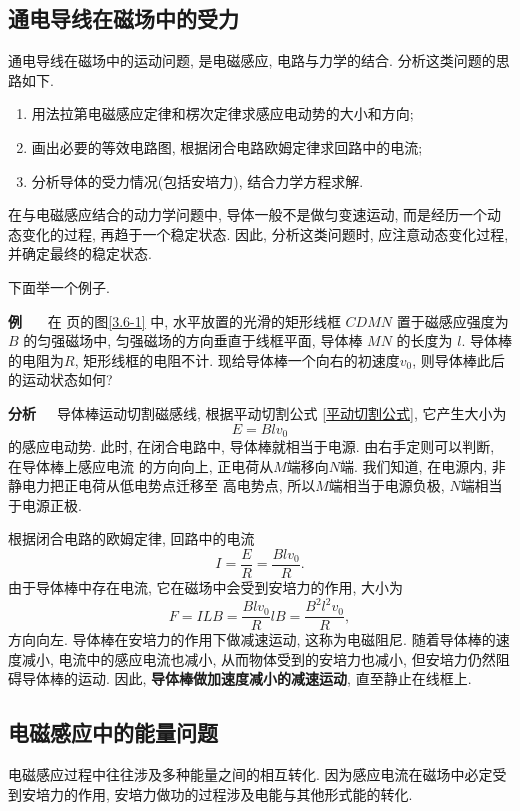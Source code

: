 \documentclass[11pt,a4paper]{ctexbook}
\newcounter{exam}[chapter]
\newcommand{\bre}{\ \ \ }
\newcommand{\examlabel}{\textbf{例\theexam}}
\newenvironment{example}{\bigskip\par\refstepcounter{exam}\examlabel\bre}{\par}
\begin{document}
\subsection{通电导线在磁场中的受力}

通电导线在磁场中的运动问题, 是电磁感应, 电路与力学的结合. 分析这类问题的思路如下.
\begin{enumerate}
    \item 用法拉第电磁感应定律和楞次定律求感应电动势的大小和方向;
    \item 画出必要的等效电路图, 根据闭合电路欧姆定律求回路中的电流;
    \item 分析导体的受力情况(包括安培力), 结合力学方程求解.
\end{enumerate}

在与电磁感应结合的动力学问题中,
导体一般不是做匀变速运动, 而是经历一个动态变化的过程, 再趋于一个稳定状态.
因此, 分析这类问题时, 应注意动态变化过程, 并确定最终的稳定状态.

下面举一个例子.

\begin{example}
    在\pageref{3.6-1} 页的图\ref{3.6-1} 中, 水平放置的光滑的矩形线框 $CDMN$ 置于磁感应强度为 $B$ 的匀强磁场中, 匀强磁场的方向垂直于线框平面, 导体棒 $MN$ 的长度为
$l$. 导体棒的电阻为$R$, 矩形线框的电阻不计. 现给导体棒一个向右的初速度$v_0$, 则导体棒此后的运动状态如何?
\end{example}

\textbf{分析}\bre 导体棒运动切割磁感线, 根据平动切割公式 \eqref{平动切割公式}, 它产生大小为
$$E = Blv_0$$的感应电动势. 此时, 在闭合电路中, 导体棒就相当于电源. 由右手定则可以判断, 在导体棒上感应电流
的方向向上, 正电荷从$M$端移向$N$端. 我们知道, 在电源内, 非静电力把正电荷从低电势点迁移至
高电势点, 所以$M$端相当于电源负极, $N$端相当于电源正极.

根据闭合电路的欧姆定律, 回路中的电流$$I = \frac{E}{R} = \frac{Blv_0}{R}.$$
由于导体棒中存在电流, 它在磁场中会受到安培力的作用, 大小为$$F = ILB = \frac{Blv_0}{R}lB = \frac{B^2l^2v_0}{R},$$
方向向左. 导体棒在安培力的作用下做减速运动, 这称为电磁阻尼. 随着导体棒的速度减小, 电流中的感应电流也减小,
从而物体受到的安培力也减小, 但安培力仍然阻碍导体棒的运动. 因此, \textbf{导体棒做加速度减小的减速运动}, 直至静止在线框上.

\subsection{电磁感应中的能量问题}

电磁感应过程中往往涉及多种能量之间的相互转化.
因为感应电流在磁场中必定受到安培力的作用, 安培力做功的过程涉及电能与其他形式能的转化.
\end{document}
